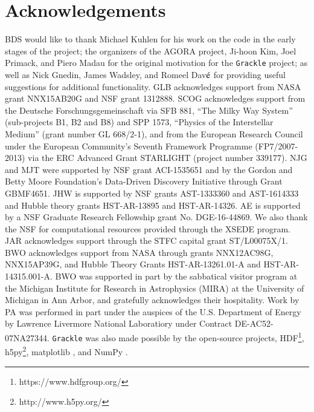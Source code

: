 \section*{Acknowledgements}

BDS would like to thank Michael Kuhlen for his work on the code in the
early stages of the project; the organizers of the AGORA project,
Ji-hoon Kim, Joel Primack, and Piero Madau for the original motivation
for the \texttt{Grackle} project; as well as Nick Gnedin, James
Wadsley, and Romeel Dav$\acute{\rm e}$ for providing useful
suggestions for additional functionality.  GLB acknowledges support
from NASA grant NNX15AB20G and NSF grant 1312888. SCOG acknowledges
support from the Deutsche Forschungsgemeinschaft via SFB 881, ``The
Milky Way System'' (sub-projects B1, B2 and B8) and SPP 1573,
``Physics of the Interstellar Medium'' (grant number GL 668/2-1), and
from the European Research Council under the European Community's
Seventh Framework Programme (FP7/2007-2013) via the ERC Advanced Grant
STARLIGHT (project number 339177).  NJG and MJT were supported by NSF
grant ACI-1535651 and by the Gordon and Betty Moore Foundation's
Data-Driven Discovery Initiative through Grant GBMF4651.  JHW is
supported by NSF grants AST-1333360 and AST-1614333 and Hubble theory
grants HST-AR-13895 and HST-AR-14326.  AE is supported by a NSF
Graduate Research Fellowship grant No. DGE-16-44869. We also thank the
NSF for computational resources provided through the XSEDE
program. JAR acknowledges support through the STFC capital grant
ST/L00075X/1.  BWO acknowledges support from  NASA through grants
NNX12AC98G, NNX15AP39G, and Hubble Theory Grants HST-AR-13261.01-A and
HST-AR-14315.001-A.  BWO was supported in part by the sabbatical
visitor program at the Michigan Institute for Research in Astrophysics
(MIRA) at the University of Michigan in Ann Arbor, and gratefully
acknowledges their hospitality.
Work by PA was performed in part under the auspices of
the U.S. Department of Energy by Lawrence Livermore National
Laboratiory under Contract DE-AC52-07NA27344.  \texttt{Grackle} was
also made possible by the open-source projects,
HDF\footnote{https://www.hdfgroup.org/},
h5py\footnote{http://www.h5py.org/}, matplotlib
\citep{2005ASPC..347...91B}, and NumPy \citep{numpy}.

